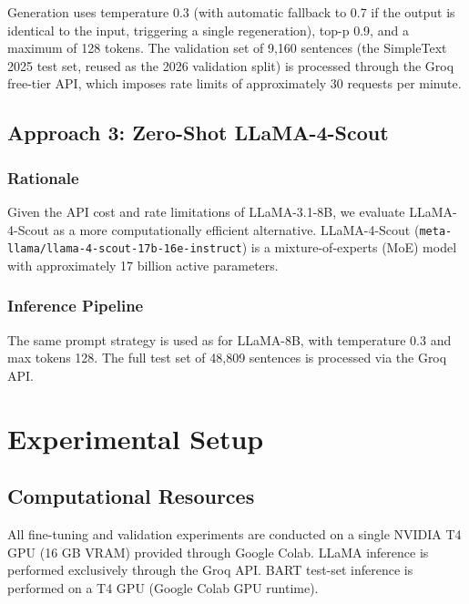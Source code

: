 \documentclass{ceurart}
\begin{document}
Generation uses temperature 0.3 (with automatic fallback to 0.7 if the output is identical to the input, triggering a single regeneration), top-p 0.9, and a maximum of 128 tokens.
The validation set of 9,160 sentences (the SimpleText 2025 test set, reused as the 2026 validation split) is processed through the Groq free-tier API, which imposes rate limits of approximately 30 requests per minute.

\subsection{Approach 3: Zero-Shot LLaMA-4-Scout}

\subsubsection{Rationale}

Given the API cost and rate limitations of LLaMA-3.1-8B, we evaluate LLaMA-4-Scout \cite{llama4} as a more computationally efficient alternative.
LLaMA-4-Scout (\texttt{meta-llama/llama-4-scout-17b-16e-instruct}) is a mixture-of-experts (MoE) model with approximately 17 billion active parameters.

\subsubsection{Inference Pipeline}

The same prompt strategy is used as for LLaMA-8B, with temperature 0.3 and max tokens 128.
The full test set of 48,809 sentences is processed via the Groq API.

\section{Experimental Setup}

\subsection{Computational Resources}

All fine-tuning and validation experiments are conducted on a single NVIDIA T4 GPU (16 GB VRAM) provided through Google Colab.
LLaMA inference is performed exclusively through the Groq API.
BART test-set inference is performed on a T4 GPU (Google Colab GPU runtime).
\end{document}
